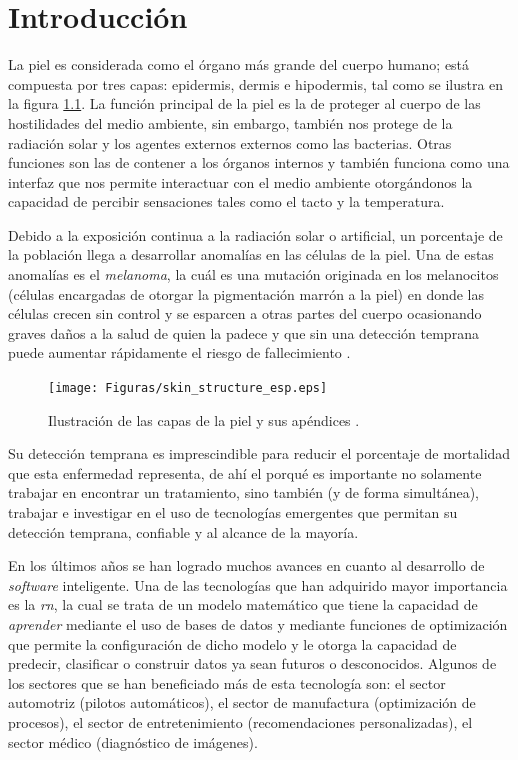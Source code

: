 
\doublespacing


\chapter{Introducción}

La piel es considerada como el órgano más grande del cuerpo humano; está compuesta por tres capas: epidermis, dermis e hipodermis, tal como se ilustra en la figura \ref{fig:skin1_jpg}. La función principal de la piel es la de proteger al cuerpo de las hostilidades del medio ambiente, sin embargo, también nos protege de la radiación solar y los agentes externos externos como las bacterias. Otras funciones son las de contener a los órganos internos y también funciona como una interfaz que nos permite interactuar con el medio ambiente otorgándonos la capacidad de percibir sensaciones tales como el tacto y la temperatura.

Debido a la exposición continua a la radiación solar o artificial, un porcentaje de la población llega a desarrollar anomalías en las células de la piel. Una de estas anomalías es el \emph{melanoma}, la cuál es una mutación originada en los melanocitos (células encargadas de otorgar la pigmentación marrón a la piel) en donde las células crecen sin control y se esparcen a otras partes del cuerpo ocasionando graves daños a la salud de quien la padece y que sin una detección temprana puede aumentar rápidamente el riesgo de fallecimiento \citep{cancer_org}.

\begin{figure}[b!]
    \texttt{[image: Figuras/skin\_structure\_esp.eps]}
    \centering
    \caption{Ilustración de las capas de la piel y sus apéndices \citep{skin_1}.}
    \label{fig:skin1_jpg}
\end{figure}

 Su detección temprana es imprescindible para reducir el porcentaje de mortalidad que esta enfermedad representa, de ahí el porqué es importante no solamente trabajar en encontrar un tratamiento, sino también (y de forma simultánea), trabajar e investigar en el uso de tecnologías emergentes que permitan su detección temprana, confiable y al alcance de la mayoría.

En los últimos años se han logrado muchos avances en cuanto al desarrollo de \emph{software} inteligente. Una de las tecnologías que han adquirido mayor importancia es la \emph{\gls{rn}}, la cual se trata de un modelo matemático que tiene la capacidad de \emph{aprender} mediante el uso de bases de datos y mediante funciones de optimización que permite la configuración de dicho modelo y le otorga la capacidad de predecir, clasificar o construir datos ya sean futuros o desconocidos. Algunos de los sectores que se han beneficiado más de esta tecnología son: el sector automotriz (pilotos automáticos), el sector de manufactura (optimización de procesos), el sector de entretenimiento (recomendaciones personalizadas), el sector médico (diagnóstico de imágenes). 

